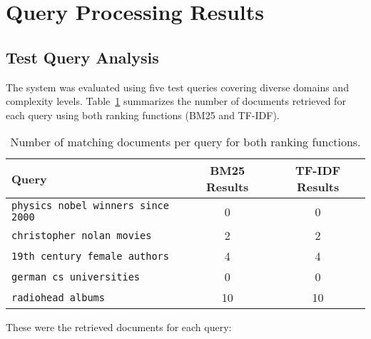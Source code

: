 \documentclass[sigconf]{acmart}
\begin{document}
\section{Query Processing Results}

\subsection{Test Query Analysis}

The system was evaluated using five test queries covering diverse domains and complexity levels. Table~\ref{tab:query_analysis} summarizes the number of documents retrieved for each query using both ranking functions (BM25 and TF-IDF).

\begin{table}[H]
\centering
\begin{tabular}{|l|c|c|}
\hline
\textbf{Query} & \textbf{BM25 Results} & \textbf{TF-IDF Results} \\ \hline
\texttt{physics nobel winners since 2000} & 0 & 0 \\ \hline
\texttt{christopher nolan movies} & 2 & 2 \\ \hline
\texttt{19th century female authors} & 4 & 4 \\ \hline
\texttt{german cs universities} & 0 & 0 \\ \hline
\texttt{radiohead albums} & 10 & 10 \\ \hline
\end{tabular}
\caption{Number of matching documents per query for both ranking functions.}
\label{tab:query_analysis}
\end{table}
These were the retrieved documents for each query:
\end{document}
